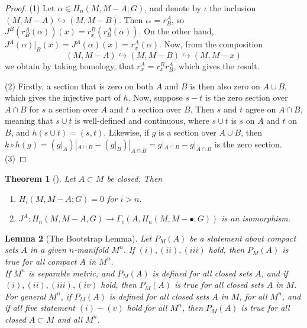 \documentclass[reqno]{amsart}
\newtheorem{theorem}{Theorem}[section]
\newtheorem{lemma}[theorem]{Lemma}
\theoremstyle{definition}
\theoremstyle{remark}
\begin{document}
\begin{proof}
    (1) Let $\alpha \in 
    H_n(M, M - A;G)$, and denote by
    $\iota$ the inclusion $(M, M-A) \hookrightarrow (M, M-B)$.
    Then $\iota_* = r_{B}^{A}$, so
    $J^{B} \left( r_{B}^{A} (\alpha) \right) (x)
    = r_{x}^{B}\left( r_{B}^{A} (\alpha) \right) $.
    On the other hand, 
    $J^{A}(\alpha)|_{B}(x) =
    J^{A}(\alpha)(x) = 
    r_x^{A}(\alpha)$.
    Now, from the composition
    \[
        (M, M - A) \hookrightarrow 
        (M, M - B) \hookrightarrow 
        (M, M - x)
    \] 
    we obtain by taking homology, that
    $r_x^{A} = r_x^{B} r_{B}^{A}$, which gives the
    result.\\
    \linebreak
    
    (2) Firstly, a section that is zero on both
    $A$ and $B$ is then also zero on
    $A \cup  B$, which gives the injective part
    of $h$. Now, 
    suppose $s-t$ is the zero section over $A \cap B$ 
    for $s$ a section over $A$ and $t$ a section over $B$.
    Then $s$ and $t$ agree on $A \cap B$, meaning that
    $s \cup t$ is well-defined and continuous, where
    $s \cup t$ is $s$ on $A$ and $t$ on $B$, and
    $h(s \cup t) = (s,t)$. Likewise, if
    $g$ is a section over $A \cup  B$, then
    $k \circ h(g) = \left( g|_{A} \right)|_{A \cap B}
    - \left( g|_{B} \right)|_{A \cap B}
    = g|_{A \cap B} - g|_{A \cap B}$ is the
    zero section.\\
    \linebreak
    (3) 

\end{proof}


\begin{theorem}[]
    Let $A \subset M$ be closed. Then
    \begin{enumerate}
        \item $H_i \left( M , M - A; G \right) = 0$ for $i>n$.
        \item $J^{A} \colon H_n (M, M - A, G) \to 
            \Gamma_c (A, 
            H_n\left( M, M - \bullet;G \right) )$ is an isomorphism.
    \end{enumerate}
\end{theorem}



\begin{lemma}[The Bootstrap Lemma]
    Let $P_M (A)$ be a statement about compact sets
    $A$ in a given $n$-manifold $M^{n}$. If
    $(i), (ii), (iii)$ hold, then $P_M(A)$ is true
    for all compact $A$ in $M^{n}$.\\
    If $M^{n}$ is separable metric, and $P_M(A)$ is defined
    for all closed sets $A$, and if 
    $(i), (ii), (iii), (iv)$ hold, then $P_M(A)$ is true
    for all closed sets $A$ in $M$.\\
    For general $M^{n}$, if $P_M(A)$ is defined for all closed
    sets $A$ in $M$, for all $M^{n}$, and if all
    five statement $(i) - (v)$ hold for all $M^{n}$, then
    $P_M(A)$ is true for all closed $A \subset M$ and
    all $M^{n}$.
\end{lemma}
\end{document}
